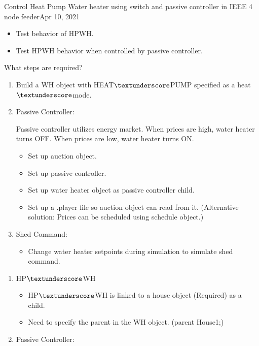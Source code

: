\begin{entry}{Control Heat Pump Water heater using switch and passive controller in IEEE 4 node feeder}{Apr 10, 2021}
    \objective 
    \begin{itemize}
        \item Test behavior of HPWH.
        \item Test HPWH behavior when controlled by passive controller.
    \end{itemize}
    \outline
    
    What steps are required?
    \begin{enumerate}
        \item Build a WH object with HEAT$\textunderscore$PUMP specified as a heat$\textunderscore$mode.
        \item Passive Controller:\par
        Passive controller utilizes energy market. When prices are high, water heater turns OFF. When prices are low, water heater turns ON.
        \begin{itemize}
            \item Set up auction object.
            \item Set up passive controller.
            \item Set up water heater object as passive controller child.
            \item Set up a .player file so auction object can read from it. (Alternative solution: Prices can be scheduled using schedule object.)
        \end{itemize}
        \item Shed Command:
        \begin{itemize}
            \item Change water heater setpoints during simulation to simulate shed command.
        \end{itemize}
    \end{enumerate}
    \procedures
    \begin{enumerate}
        \item HP$\textunderscore$WH
        \begin{itemize}
            \item HP$\textunderscore$WH is linked to a house object (Required) as a child.
            \item Need to specify the parent in the WH object. (parent House1;) 
        \end{itemize}
        \item Passive Controller:

\end{enumerate}
\end{entry}
